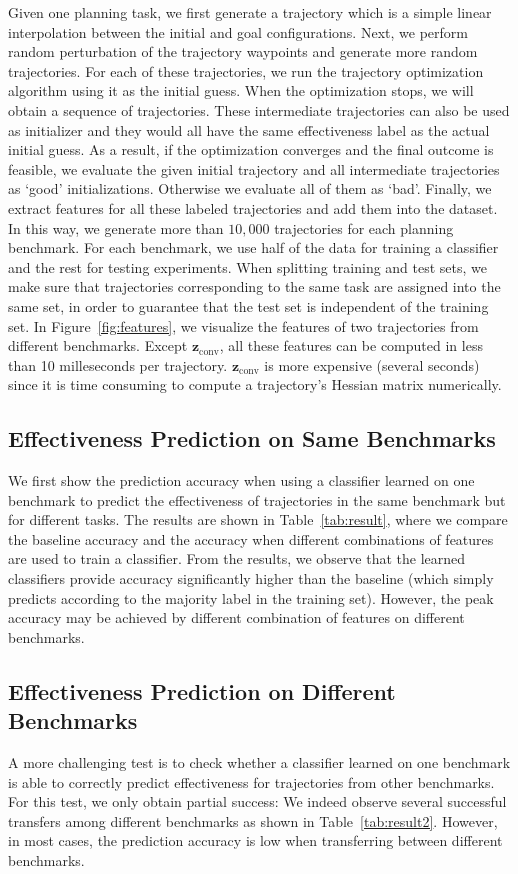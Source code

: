\documentclass[letterpaper, 10 pt, conference]{ieeeconf}  %
\newcommand{\fconv}{\mbox{$\mathbf z_{\text{conv}}$}}
\begin{document}
Given one planning task, we first generate a trajectory which is a simple linear interpolation between the initial and goal configurations. Next, we perform random perturbation of the trajectory waypoints and generate more random trajectories. For each of these trajectories, we run the trajectory optimization algorithm using it as the initial guess. When the optimization stops, we will obtain a sequence of trajectories. These intermediate trajectories can also be used as initializer and they would all have the same effectiveness label as the actual initial guess. As a result, if the optimization converges and the final outcome is feasible, we evaluate the given initial trajectory and all intermediate trajectories as `good' initializations. Otherwise we evaluate all of them as `bad'. Finally, we extract features for all these labeled trajectories and add them into the dataset. In this way, we generate more than $10,000$ trajectories for each planning benchmark. For each benchmark, we use half of the data for training a classifier and the rest for testing experiments. When splitting training and test sets, we make sure that trajectories corresponding to the same task are assigned into the same set, in order to guarantee that the test set is independent of the training set. In Figure~\ref{fig:features}, we visualize the features of two trajectories from different benchmarks. Except $\fconv$, all these features can be computed in less than 10 milleseconds per trajectory. $\fconv$ is more expensive (several seconds) since it is time consuming to compute a trajectory's Hessian matrix numerically.

\subsection{Effectiveness Prediction on Same Benchmarks}
We first show the prediction accuracy when using a classifier learned on one benchmark to predict the effectiveness of trajectories in the same benchmark but for different tasks. The results are shown in Table~\ref{tab:result}, where we compare the baseline accuracy and the accuracy when different combinations of features are used to train a classifier. From the results, we observe that the learned classifiers provide accuracy significantly higher than the baseline (which simply predicts according to the majority label in the training set). However, the peak accuracy may be achieved by different combination of features on different benchmarks.

\subsection{Effectiveness Prediction on Different Benchmarks}
A more challenging test is to check whether a classifier learned on one benchmark is able to correctly predict effectiveness for trajectories from other benchmarks. For this test, we only obtain partial success: We indeed observe several successful transfers among different benchmarks as shown in Table~\ref{tab:result2}. However, in most cases, the prediction accuracy is low when transferring between different benchmarks.
\end{document}
